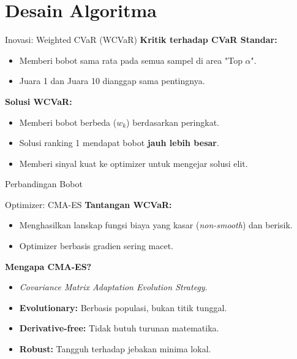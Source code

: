 \documentclass[10pt]{beamer}
\begin{document}
\section{Desain Algoritma}
\begin{frame}{Inovasi: Weighted CVaR (WCVaR)}
    \textbf{Kritik terhadap CVaR Standar:}
    \begin{itemize}
        \item Memberi bobot sama rata pada semua sampel di area "Top $\alpha$".
        \item Juara 1 dan Juara 10 dianggap sama pentingnya.
    \end{itemize}
    
    \vspace{0.3cm}
    \textbf{Solusi WCVaR:}
    \begin{itemize}
        \item Memberi bobot berbeda ($w_k$) berdasarkan peringkat.
        \item Solusi ranking 1 mendapat bobot \textbf{jauh lebih besar}.
        \item Memberi sinyal kuat ke optimizer untuk mengejar solusi elit.
    \end{itemize}

    \vspace{0.3cm}
    \begin{exampleblock}{Perbandingan Bobot}
    \end{exampleblock}
\end{frame}

\begin{frame}{Optimizer: CMA-ES}
    \textbf{Tantangan WCVaR:}
    \begin{itemize}
        \item Menghasilkan lanskap fungsi biaya yang kasar (\textit{non-smooth}) dan berisik.
        \item Optimizer berbasis gradien sering macet.
    \end{itemize}
    
    \vspace{0.5cm}
    \textbf{Mengapa CMA-ES?}
    \begin{itemize}
        \item \textit{Covariance Matrix Adaptation Evolution Strategy}.
        \item \textbf{Evolutionary:} Berbasis populasi, bukan titik tunggal.
        \item \textbf{Derivative-free:} Tidak butuh turunan matematika.
        \item \textbf{Robust:} Tangguh terhadap jebakan minima lokal.
    \end{itemize}
\end{frame}
\end{document}
